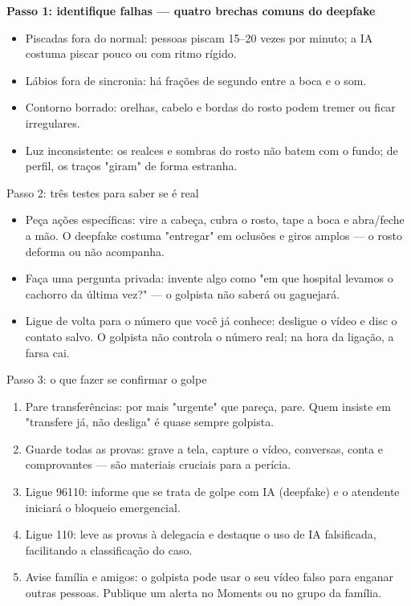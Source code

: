 \textbf{Passo 1: identifique falhas — quatro brechas comuns do deepfake}\par

\begin{itemize}
  \item Piscadas fora do normal: pessoas piscam 15–20 vezes por minuto; a IA costuma piscar pouco ou com ritmo rígido.
  \item Lábios fora de sincronia: há frações de segundo entre a boca e o som.
  \item Contorno borrado: orelhas, cabelo e bordas do rosto podem tremer ou ficar irregulares.
  \item Luz inconsistente: os realces e sombras do rosto não batem com o fundo; de perfil, os traços "giram" de forma estranha.
\end{itemize}

\begin{tcbinfo}{Passo 2: três testes para saber se é real}
\begin{itemize}
  \item Peça ações específicas: vire a cabeça, cubra o rosto, tape a boca e abra/feche a mão. O deepfake costuma "entregar" em oclusões e giros amplos — o rosto deforma ou não acompanha.
  \item Faça uma pergunta privada: invente algo como "em que hospital levamos o cachorro da última vez?" — o golpista não saberá ou gaguejará.
  \item Ligue de volta para o número que você já conhece: desligue o vídeo e disc o contato salvo. O golpista não controla o número real; na hora da ligação, a farsa cai.
\end{itemize}

\end{tcbinfo}

\begin{tcbwarn}{Passo 3: o que fazer se confirmar o golpe}
\begin{enumerate}
  \item Pare transferências: por mais "urgente" que pareça, pare. Quem insiste em "transfere já, não desliga" é quase sempre golpista.
  \item Guarde todas as provas: grave a tela, capture o vídeo, conversas, conta e comprovantes — são materiais cruciais para a perícia.
  \item Ligue 96110: informe que se trata de golpe com IA (deepfake) e o atendente iniciará o bloqueio emergencial.
  \item Ligue 110: leve as provas à delegacia e destaque o uso de IA falsificada, facilitando a classificação do caso.
  \item Avise família e amigos: o golpista pode usar o seu vídeo falso para enganar outras pessoas. Publique um alerta no Moments ou no grupo da família.
\end{enumerate}

\end{tcbwarn}

